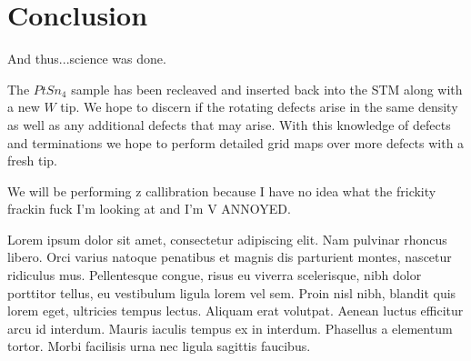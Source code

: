 \chapter{Conclusion}
\label{ch:conclusion}

And thus...science was done.

The $PtSn_4$ sample has been recleaved and inserted back into the STM along with a new $W$ tip. We hope to discern if the rotating defects arise in the same density as well as any additional defects that may arise. With this knowledge of defects and terminations we hope to perform detailed grid maps over more defects with a fresh tip.

We will be performing z callibration because I have no idea what the frickity frackin fuck I'm looking at and I'm V ANNOYED.

Lorem ipsum dolor sit amet, consectetur adipiscing elit. Nam pulvinar rhoncus libero. Orci varius natoque penatibus et magnis dis parturient montes, nascetur ridiculus mus. Pellentesque congue, risus eu viverra scelerisque, nibh dolor porttitor tellus, eu vestibulum ligula lorem vel sem. Proin nisl nibh, blandit quis lorem eget, ultricies tempus lectus. Aliquam erat volutpat. Aenean luctus efficitur arcu id interdum. Mauris iaculis tempus ex in interdum. Phasellus a elementum tortor. Morbi facilisis urna nec ligula sagittis faucibus.
